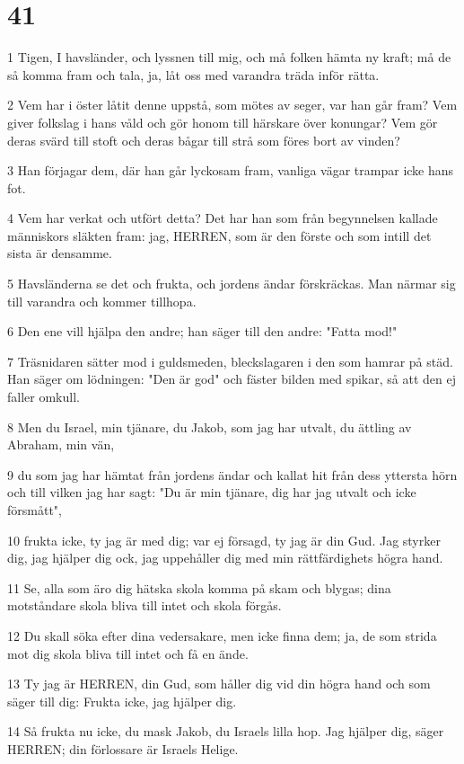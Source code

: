 \chapter{41}

\par 1 Tigen, I havsländer, och lyssnen till mig, och må folken hämta ny kraft; må de så komma fram och tala, ja, låt oss med varandra träda inför rätta.
\par 2 Vem har i öster låtit denne uppstå, som mötes av seger, var han går fram? Vem giver folkslag i hans våld och gör honom till härskare över konungar? Vem gör deras svärd till stoft och deras bågar till strå som föres bort av vinden?
\par 3 Han förjagar dem, där han går lyckosam fram, vanliga vägar trampar icke hans fot.
\par 4 Vem har verkat och utfört detta? Det har han som från begynnelsen kallade människors släkten fram: jag, HERREN, som är den förste och som intill det sista är densamme.
\par 5 Havsländerna se det och frukta, och jordens ändar förskräckas. Man närmar sig till varandra och kommer tillhopa.
\par 6 Den ene vill hjälpa den andre; han säger till den andre: "Fatta mod!"
\par 7 Träsnidaren sätter mod i guldsmeden, bleckslagaren i den som hamrar på städ. Han säger om lödningen: "Den är god" och fäster bilden med spikar, så att den ej faller omkull.
\par 8 Men du Israel, min tjänare, du Jakob, som jag har utvalt, du ättling av Abraham, min vän,
\par 9 du som jag har hämtat från jordens ändar och kallat hit från dess yttersta hörn och till vilken jag har sagt: "Du är min tjänare, dig har jag utvalt och icke försmått",
\par 10 frukta icke, ty jag är med dig; var ej försagd, ty jag är din Gud. Jag styrker dig, jag hjälper dig ock, jag uppehåller dig med min rättfärdighets högra hand.
\par 11 Se, alla som äro dig hätska skola komma på skam och blygas; dina motståndare skola bliva till intet och skola förgås.
\par 12 Du skall söka efter dina vedersakare, men icke finna dem; ja, de som strida mot dig skola bliva till intet och få en ände.
\par 13 Ty jag är HERREN, din Gud, som håller dig vid din högra hand och som säger till dig: Frukta icke, jag hjälper dig.
\par 14 Så frukta nu icke, du mask Jakob, du Israels lilla hop. Jag hjälper dig, säger HERREN; din förlossare är Israels Helige.

